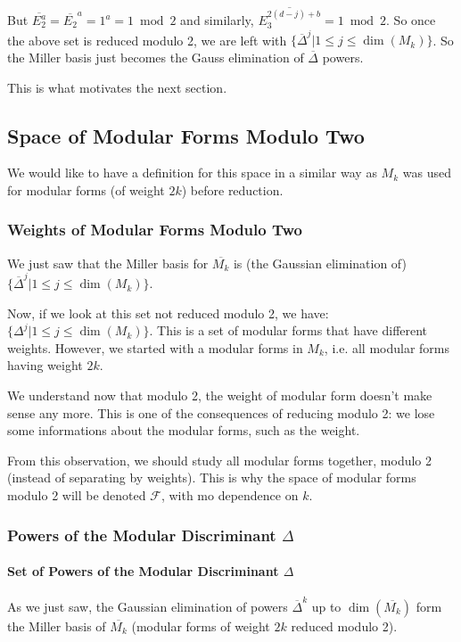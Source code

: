 But $\overline{E_2^a} = \overline{E_2}^a = 1^a = 1 \bmod 2$ and similarly, $\overline{E_3^{2(d-j)+b}} = 1 \bmod 2$.
So once the above set is reduced modulo 2, we are left with $\{ \overline{\Delta}^j | 1 \leq j \leq \dim(M_k) \}$.
So the Miller basis just becomes the Gauss elimination of $\overline{\Delta}$ powers.

This is what motivates the next section.

\subsection{Space of Modular Forms Modulo Two}
We would like to have a definition for this space in a similar way as $M_k$ was used for modular forms (of weight $2k$) before reduction.

\subsubsection{Weights of Modular Forms Modulo Two}
\label{WeightModuloTwo}
We just saw that the Miller basis for $\overline{M_k}$ is (the Gaussian elimination of) $\{ \overline{\Delta}^j | 1 \leq j \leq \dim(M_k) \}$.

Now, if we look at this set not reduced modulo 2, we have:
$\{ \Delta^j | 1 \leq j \leq \dim(M_k) \}$.
This is a set of modular forms that have different weights.
However, we started with a modular forms in $M_k$, i.e. all modular forms having weight $2k$.

We understand now that modulo 2, the weight of modular form doesn't make sense any more.
This is one of the consequences of reducing modulo 2: we lose some informations about the modular forms, such as the weight.

From this observation, we should study all modular forms together, modulo 2 (instead of separating by weights).
This is why the space of modular forms modulo 2 will be denoted  $\mathcal{F}$, with mo dependence on $k$.

\subsubsection{Powers of the Modular Discriminant $\Delta$}
\paragraph{Set of Powers of the Modular Discriminant $\Delta$}
As we just saw, the Gaussian elimination of powers $\overline{\Delta}^k$ up to $\dim(\overline{M_k})$ form the Miller basis of $\overline{M_k}$ (modular forms of weight $2k$ reduced modulo 2).

